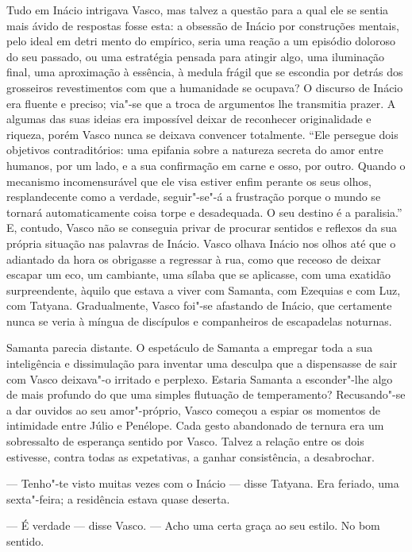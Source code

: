 Tudo em Inácio intrigava Vasco, mas talvez a questão para a qual ele se
sentia mais ávido de respostas fosse esta: a obsessão de Inácio por
construções mentais, pelo ideal em detri
mento do empírico, seria uma reação a um episódio doloroso do seu
passado, ou uma estratégia pensada para atingir algo, uma iluminação
final, uma aproximação à essência, à medula frágil que se escondia por
detrás dos grosseiros revestimentos com que a humanidade se ocupava? O
discurso de Inácio era fluente e preciso; via"-se que a troca de
argumentos lhe transmitia prazer. A algumas das suas ideias era
impossível deixar de reconhecer originalidade e riqueza, porém Vasco
nunca se deixava convencer totalmente. ``Ele persegue dois objetivos
contraditórios: uma epifania sobre a natureza secreta do amor entre
humanos, por um lado, e a sua confirmação em carne e osso, por outro.
Quando o mecanismo incomensurável que ele visa estiver enfim perante os
seus olhos, resplandecente como a verdade, seguir"-se"-á a frustração
porque o mundo se tornará automaticamente coisa torpe e desadequada. O
seu destino é a paralisia.'' E, contudo, Vasco não se conseguia privar de
procurar sentidos e reflexos da sua própria situação nas palavras de
Inácio. Vasco olhava Inácio nos olhos até que o adiantado da hora os
obrigasse a regressar à rua, como que receoso de deixar escapar um eco,
um cambiante, uma sílaba que se aplicasse, com uma exatidão
surpreendente, àquilo que estava a viver com Samanta, com Ezequias e com
Luz, com Tatyana. Gradualmente, Vasco foi"-se afastando de Inácio, que
certamente nunca se veria à míngua de discípulos e companheiros de
escapadelas noturnas.

Samanta parecia distante. O espetáculo de Samanta a
empregar toda a sua inteligência e dissimulação para inventar uma
desculpa que a dispensasse de sair com Vasco deixava"-o irritado e
perplexo. Estaria Samanta a esconder"-lhe algo de mais profundo do que
uma simples flutuação de temperamento? Recusando"-se a dar ouvidos ao
seu amor"-próprio, Vasco começou a espiar os momentos de intimidade entre Júlio e Penélope. Cada
gesto abandonado de ternura era um sobressalto de esperança sentido
por Vasco. Talvez a relação entre os dois estivesse, contra todas as
expetativas, a ganhar consistência, a desabrochar.

--- Tenho"-te visto muitas vezes com o Inácio --- disse Tatyana. Era
  feriado, uma sexta"-feira; a residência estava quase deserta.

--- É verdade --- disse Vasco. --- Acho uma certa graça ao seu estilo. No
  bom sentido.

